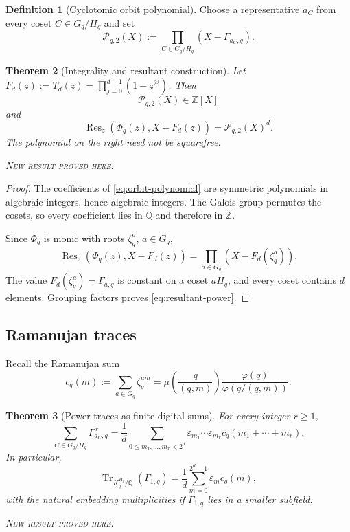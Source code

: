 \documentclass[11pt,oneside]{article}
\newtheorem{theorem}{Theorem}[section]
\theoremstyle{definition}
\newtheorem{definition}[theorem]{Definition}
\theoremstyle{remark}
\newcommand{\Q}{\mathbb Q}
\newcommand{\Z}{\mathbb Z}
\newcommand{\Tr}{\operatorname{Tr}}
\newcommand{\Res}{\operatorname{Res}}
\newcommand{\eps}{\varepsilon}
\newcommand{\newresult}{\textcolor{newgreen}{\textsc{New result proved here.}}}
\begin{document}
\begin{definition}[Cyclotomic orbit polynomial]
Choose a representative $a_C$ from every coset $C\in G_q/H_q$ and set
\begin{equation}
 \mathscr P_{q,2}(X):=\prod_{C\in G_q/H_q}(X-\Gamma_{a_C,q}).
 \label{eq:orbit-polynomial}
\end{equation}
\end{definition}

\begin{theorem}[Integrality and resultant construction]\label{thm:orbit-resultant}
Let $F_d(z):=T_d(z)=\prod_{j=0}^{d-1}(1-z^{2^j})$. Then
\begin{equation}
 \mathscr P_{q,2}(X)\in\Z[X]
 \label{eq:orbit-integral}
\end{equation}
and
\begin{equation}
 \boxed{
 \Res_z\!\left(\Phi_q(z),X-F_d(z)\right)=\mathscr P_{q,2}(X)^d.}
 \label{eq:resultant-power}
\end{equation}
The polynomial on the right need not be squarefree.

\smallskip\noindent\newresult
\end{theorem}

\begin{proof}
The coefficients of \eqref{eq:orbit-polynomial} are symmetric polynomials in
algebraic integers, hence algebraic integers. The Galois group permutes the cosets,
so every coefficient lies in $\Q$ and therefore in $\Z$.

Since $\Phi_q$ is monic with roots $\zeta_q^a$, $a\in G_q$,
\[
 \Res_z(\Phi_q(z),X-F_d(z))
 =\prod_{a\in G_q}(X-F_d(\zeta_q^a)).
\]
The value $F_d(\zeta_q^a)=\Gamma_{a,q}$ is constant on a coset $aH_q$, and every
coset contains $d$ elements. Grouping factors proves \eqref{eq:resultant-power}.
\end{proof}

\subsection{Ramanujan traces}

Recall the Ramanujan sum
\begin{equation}
 c_q(m):=\sum_{a\in G_q}\zeta_q^{am}
 =\mu\!\left(\frac{q}{(q,m)}\right)
 \frac{\varphi(q)}{\varphi(q/(q,m))}.
 \label{eq:Ramanujan-sum}
\end{equation}

\begin{theorem}[Power traces as finite digital sums]\label{thm:Ramanujan-traces}
For every integer $r\ge1$,
\begin{equation}
 \boxed{
 \sum_{C\in G_q/H_q}\Gamma_{a_C,q}^{\,r}
 =\frac1d\sum_{0\le m_1,\ldots,m_r<2^d}
 \eps_{m_1}\cdots\eps_{m_r}
 c_q(m_1+\cdots+m_r).}
 \label{eq:power-trace}
\end{equation}
In particular,
\begin{equation}
 \Tr_{K_q^{H_q}/\Q}(\Gamma_{1,q})
 =\frac1d\sum_{m=0}^{2^d-1}\eps_mc_q(m),
 \label{eq:first-trace}
\end{equation}
with the natural embedding multiplicities if $\Gamma_{1,q}$ lies in a smaller
subfield.

\smallskip\noindent\newresult
\end{theorem}
\end{document}
